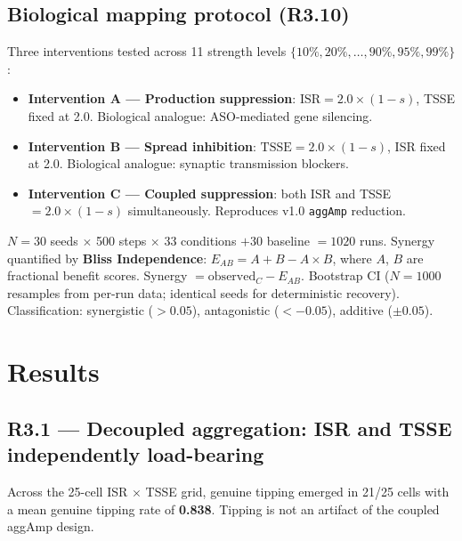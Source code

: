 \documentclass[12pt,a4paper]{article}
\begin{document}
\subsection{Biological mapping protocol (R3.10)}

Three interventions tested across 11 strength levels $\{10\%, 20\%, \ldots, 90\%, 95\%, 99\%\}$:

\begin{itemize}
\item \textbf{Intervention A --- Production suppression}: $\mathrm{ISR} = 2.0 \times
      (1-s)$, TSSE fixed at 2.0. Biological analogue: ASO-mediated gene silencing.
\item \textbf{Intervention B --- Spread inhibition}: $\mathrm{TSSE} = 2.0 \times
      (1-s)$, ISR fixed at 2.0. Biological analogue: synaptic transmission blockers.
\item \textbf{Intervention C --- Coupled suppression}: both ISR and TSSE $= 2.0 \times
      (1-s)$ simultaneously. Reproduces v1.0 \texttt{aggAmp} reduction.
\end{itemize}

$N = 30$ seeds $\times$ 500 steps $\times$ 33 conditions $+ 30$ baseline $= 1020$ runs.
Synergy quantified by \textbf{Bliss Independence}: $E_{AB} = A + B - A \times B$, where $A$,
$B$ are fractional benefit scores. Synergy $= \text{observed}_C - E_{AB}$. Bootstrap CI
($N = 1000$ resamples from per-run data; identical seeds for deterministic recovery). Classification: synergistic ($> 0.05$), antagonistic ($< -0.05$), additive ($\pm 0.05$).

\section{Results}

\subsection{R3.1 --- Decoupled aggregation: ISR and TSSE independently load-bearing}

Across the 25-cell ISR $\times$ TSSE grid, genuine tipping emerged in 21/25 cells with a mean
genuine tipping rate of \textbf{0.838}. Tipping is not an artifact of the coupled aggAmp design.
\end{document}
